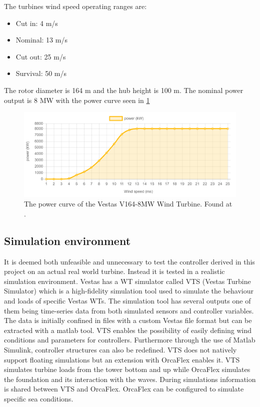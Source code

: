\newpage
\noindent The turbines wind speed operating ranges are:
\begin{itemize}
	\item Cut in: 4 m/s
	\item Nominal: 13 m/s
	\item Cut out: 25 m/s
	\item Survival: 50 m/s
\end{itemize}
The rotor diameter is 164 m and the hub height is 100 m. The nominal power output is 8 MW with the power curve seen in \cref{fig:v164_8mw_pc}
\begin{figure}[ht]
	\centering
	\includegraphics[width=0.95\linewidth]{Graphics/v164-8mw_powerCurve.PNG}
	\caption{The power curve of the Vestas V164-8MW Wind Turbine. Found at \cite{LucasBauer}.}
	\label{fig:v164_8mw_pc}
\end{figure}


\subsection{Simulation environment}
It is deemed both unfeasible and unnecessary to test the controller derived in this project on an actual real world turbine. Instead it is tested in a realistic simulation environment. Vestas has a WT simulator called VTS (Vestas Turbine Simulator) which is a high-fidelity simulation tool used to simulate the behaviour and loads of specific Vestas WTs. The simulation tool has several outputs one of them being time-series data from both simulated sensors and controller variables. The data is initially confined in files with a custom Vestas file format but can be extracted with a matlab tool. VTS enables the possibility of easily defining wind conditions and parameters for controllers. Furthermore through the use of Matlab Simulink, controller structures can also be redefined. VTS does not natively support floating simulations but an extension with OrcaFlex enables it. VTS simulates turbine loads from the tower bottom and up while OrcaFlex simulates the foundation and its interaction with the waves. During simulations information is shared between VTS and OrcaFlex. OrcaFlex can be configured to simulate specific sea conditions.


